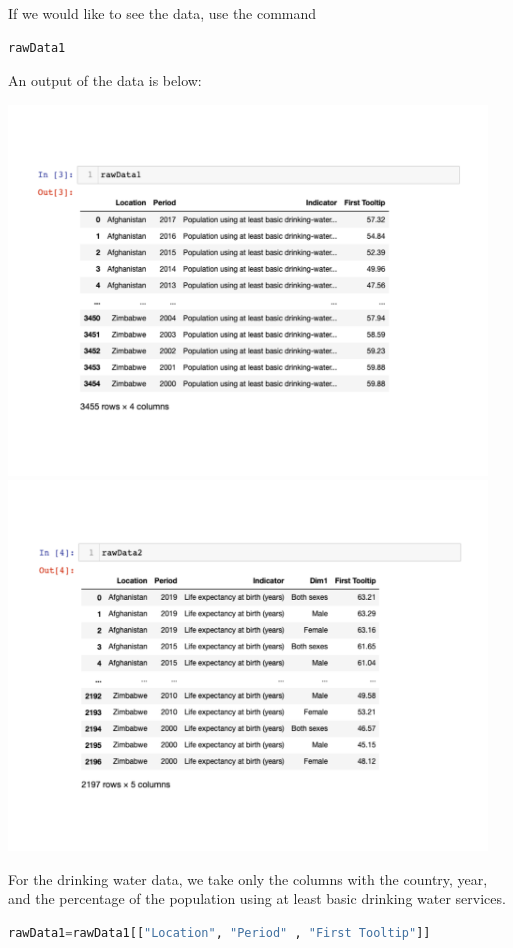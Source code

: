 \documentclass[12pt]{article}
\begin{document}
\noindent
If we would like to see the data, use the command
\begin{lstlisting}[language=Python]
rawData1
\end{lstlisting}

\noindent
An output of the data is below:

\begin{center}
\includegraphics[width=5in]{Manuscript/figure1.pdf}
\includegraphics[width=5in]{Manuscript/figure2.pdf}
\end{center}

\noindent
For the drinking water data, we take only the columns with the country, year, and the percentage of the population using at least basic drinking water services.
\begin{lstlisting}[language=Python]
rawData1=rawData1[["Location", "Period" , "First Tooltip"]]
\end{lstlisting}
\end{document}
